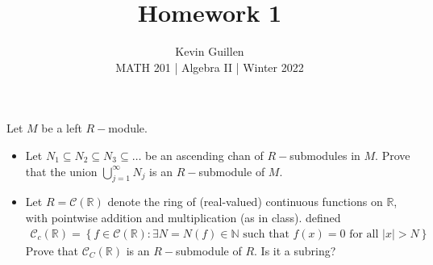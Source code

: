 \documentclass[11pt]{article}
\newenvironment{problem}[2][Problem\!]{\begin{trivlist}
\item[\hskip \labelsep {\bfseries #1}\hskip \labelsep {\bfseries #2}]}{\end{trivlist}}
\newcommand{\rr}{\mathbb R}   %
\newcommand{\nn}{\mathbb N}   %
\newcommand{\set}[1]{\left\{#1\right\}} %
\begin{document}
 
\title{Homework 1}
\author{Kevin Guillen\\[0.5em]
MATH 201 | Algebra II | Winter 2022}
\date{} 
\maketitle


\begin{tcolorbox}
  \begin{problem} {P1}
    Let $M$ be a left $R-$module.
    \begin{itemize}
        \item[(a)] Let $N_1 \subseteq N_2 \subseteq N_3 \subseteq \dots$ be an ascending chan of $R-$submodules in $M$. Prove that the union $\bigcup_{j =1 }^{\infty}N_j$ is an $R-$submodule of $M$.
        \item[(b)] Let $R = \mathcal{C}(\rr)$ denote the ring of (real-valued) continuous functions on $\rr$, with pointwise addition and multiplication (as in class). defined
        \begin{align*}
            \mathcal{C}_c(\rr) = \set{f \in \mathcal{C}(\rr) : \exists N = N(f) \in \nn \text{ such that }f(x) = 0 \text{ for all } |x| > N}
        \end{align*} 
        Prove that $\mathcal{C}_C(\rr)$ is an $R-$submodule of $R$. Is it a subring?
    \end{itemize}
  \end{problem}
\end{tcolorbox}
\end{document}
